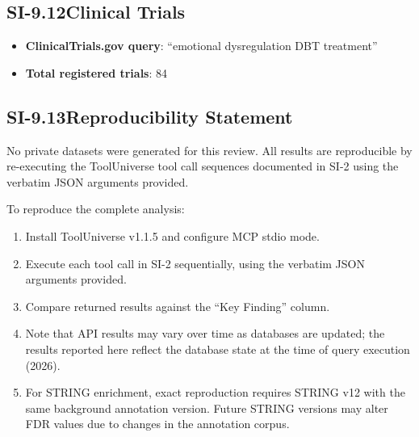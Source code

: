 \subsection*{SI-9.12\quad Clinical Trials}

\begin{itemize}[nosep]
  \item \textbf{ClinicalTrials.gov query}: ``emotional dysregulation DBT
        treatment''
  \item \textbf{Total registered trials}: 84
\end{itemize}

\subsection*{SI-9.13\quad Reproducibility Statement}

No private datasets were generated for this review.  All results are
reproducible by re-executing the ToolUniverse tool call sequences documented
in SI-2 using the verbatim JSON arguments provided.

To reproduce the complete analysis:

\begin{enumerate}[nosep]
  \item Install ToolUniverse v1.1.5 and configure MCP stdio mode.
  \item Execute each tool call in SI-2 sequentially, using the verbatim
        JSON arguments provided.
  \item Compare returned results against the ``Key Finding'' column.
  \item Note that API results may vary over time as databases are updated;
        the results reported here reflect the database state at the time
        of query execution (2026).
  \item For STRING enrichment, exact reproduction requires STRING v12 with
        the same background annotation version.  Future STRING versions may
        alter FDR values due to changes in the annotation corpus.
\end{enumerate}
